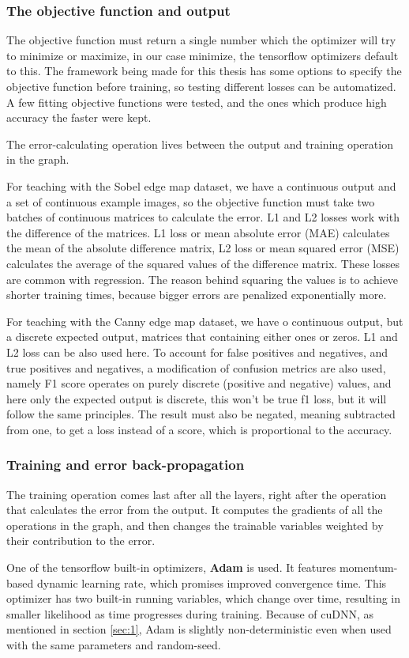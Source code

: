 \documentclass[a4paper,12pt]{article}
\begin{document}
\subsubsection{The objective function and output}
The objective function must return a single number which the optimizer will try to minimize or maximize, in our case minimize, the tensorflow optimizers default to this. The framework being made for this thesis has some options to specify the objective function before training, so testing different losses can be automatized. A few fitting objective functions were tested, and the ones which produce high accuracy the faster were kept. \par
The error-calculating operation lives between the output and training operation in the graph. \par
For teaching with the Sobel edge map dataset, we have a continuous output and a set of continuous example images, so the objective function must take two batches of continuous matrices to calculate the error. L1 and L2 losses work with the difference of the matrices. L1 loss or mean absolute error (MAE) calculates the mean of the absolute difference matrix, L2 loss or mean squared error (MSE) calculates the average of the squared values of the difference matrix. These losses are common with regression. The reason behind squaring the values is to achieve shorter training times, because bigger errors are penalized exponentially more. \par
For teaching with the Canny edge map dataset, we have o continuous output, but a discrete expected output, matrices that containing either ones or zeros. L1 and L2 loss can be also used here. To account for false positives and negatives, and true positives and negatives, a modification of confusion metrics are also used, namely F1 score operates on purely discrete (positive and negative) values, and here only the expected output is discrete, this won't be true f1 loss, but it will follow the same principles. The result must also be negated, meaning subtracted from one, to get a loss instead of a score, which is proportional to the accuracy.
\subsubsection{Training and error back-propagation} \label{sec:2}
The training operation comes last after all the layers, right after the operation that calculates the error from the output. It computes the gradients of all the operations in the graph, and then changes the trainable variables weighted by their contribution to the error.\par
One of the tensorflow built-in optimizers, \textbf{Adam} is used. It features momentum-based dynamic learning rate, which promises improved convergence time. This optimizer has two built-in running variables, which change over time, resulting in smaller likelihood as time progresses during training. Because of cuDNN, as mentioned in section \ref{sec:1}, Adam is slightly non-deterministic even when used with the same parameters and random-seed.
\end{document}
